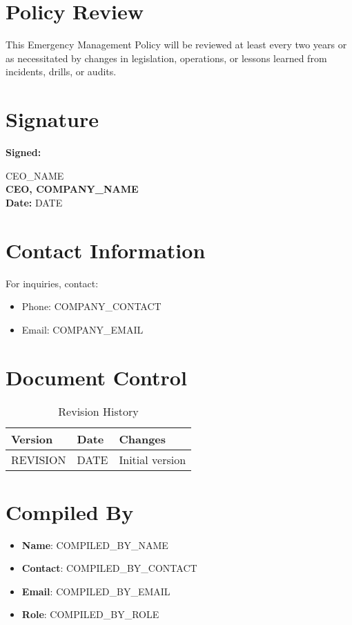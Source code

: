 \documentclass[12pt]{article}
\begin{document}
\section{Policy Review}
This Emergency Management Policy will be reviewed at least every two years or as necessitated by changes in legislation, operations, or lessons learned from incidents, drills, or audits.

\section{Signature}
\textbf{Signed:}

{{CEO_NAME}}\\
\textbf{CEO, {{COMPANY_NAME}}}\\
\textbf{Date:} {{DATE}}

\section{Contact Information}
For inquiries, contact:
\begin{itemize}
    \item Phone: {{COMPANY_CONTACT}}
    \item Email: {{COMPANY_EMAIL}}
\end{itemize}

\section{Document Control}
\begin{table}[h]
    \centering
    \begin{tabular}{p{3cm}p{3cm}p{6cm}}
        \toprule
        \textbf{Version} & \textbf{Date} & \textbf{Changes} \\
        \midrule
        {{REVISION}} & {{DATE}} & Initial version \\
        \bottomrule
    \end{tabular}
    \caption{Revision History}
\end{table}

\section{Compiled By}
\begin{itemize}
    \item \textbf{Name}: {{COMPILED_BY_NAME}}
    \item \textbf{Contact}: {{COMPILED_BY_CONTACT}}
    \item \textbf{Email}: {{COMPILED_BY_EMAIL}}
    \item \textbf{Role}: {{COMPILED_BY_ROLE}}
\end{itemize}
\end{document}
